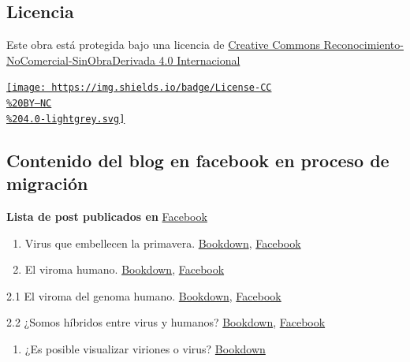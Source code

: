 \documentclass[
  12pt, krantz2,
  spanish,
]{krantz}
\providecommand{\tightlist}{%
  \setlength{\itemsep}{0pt}\setlength{\parskip}{0pt}}
\begin{document}
\hypertarget{licencia}{%
\subsection*{Licencia}\label{licencia}}

Este obra está protegida bajo una licencia de \href{https://creativecommons.org/licenses/by-nc-nd/4.0/deed.es_ES}{Creative Commons Reconocimiento-NoComercial-SinObraDerivada 4.0 Internacional}

\href{https://creativecommons.org/licenses/by-nc/4.0/}{\texttt{[image: https://img.shields.io/badge/License-CC\\\%20BY--NC\\\%204.0-lightgrey.svg]}}

\hypertarget{contenido-del-blog-en-facebook-en-proceso-de-migraciuxf3n}{%
\subsection*{Contenido del blog en facebook en proceso de migración}\label{contenido-del-blog-en-facebook-en-proceso-de-migraciuxf3n}}

\textbf{Lista de post publicados en} \href{https://www.facebook.com/permalink.php?story_fbid=174758050915684\&id=107088044349352}{Facebook}

\begin{enumerate}
\def\labelenumi{\arabic{enumi}.}
\item
  Virus que embellecen la primavera. \protect\hyperlink{vircolor}{Bookdown}, \href{https://www.facebook.com/BioViral/posts/166521528808498}{Facebook}
\item
  El viroma humano. \protect\hyperlink{viroma}{Bookdown}, \href{}{Facebook}
\end{enumerate}

2.1 El viroma del genoma humano. \protect\hyperlink{viroma_genoma}{Bookdown}, \href{https://www.facebook.com/permalink.php?story_fbid=108452037546286\&id=107088044349352}{Facebook}

2.2 ¿Somos híbridos entre virus y humanos? \protect\hyperlink{hybrids}{Bookdown}, \href{https://www.facebook.com/BioViral/posts/152069863586998}{Facebook}

\begin{enumerate}
\def\labelenumi{\arabic{enumi}.}
\setcounter{enumi}{2}
\tightlist
\item
  ¿Es posible visualizar viriones o virus? \protect\hyperlink{viralSigns}{Bookdown}
\end{enumerate}
\end{document}

